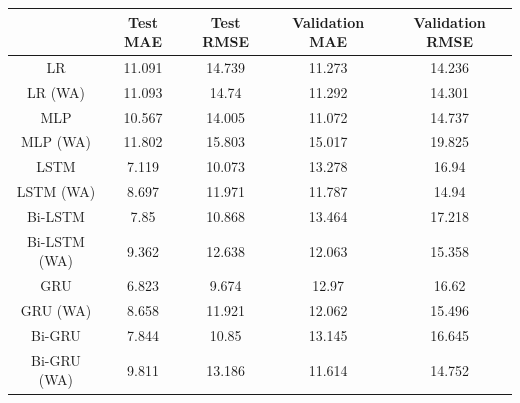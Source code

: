 \begin{table}[p]
\begin{minipage}{\textwidth}
        \vspace{0.2cm}
        \begin{tabular}{ |c|c|c|c|c| }
            \hline
            & Test MAE                  & Test RMSE                  & Validation MAE             & Validation RMSE            \\
            \hline
            LR           & \cellcolor{red!10}11.091  & \cellcolor{red!10}14.739   & \cellcolor{green!20}11.273 & \cellcolor{green!30}14.236 \\
            \hline
            LR (WA)      & \cellcolor{red!20}11.093  & \cellcolor{red!20}14.74    & \cellcolor{green!10}11.292 & \cellcolor{green!20}14.301 \\
            \hline
            MLP          & 10.567                    & 14.005                     & \cellcolor{green!30}11.072 & \cellcolor{green!10}14.737 \\
            \hline
            MLP (WA)     & \cellcolor{red!30}11.802  & \cellcolor{red!30}15.803   & \cellcolor{red!30}15.017   & \cellcolor{red!30}19.825   \\
            \hline
            LSTM         & \cellcolor{green!10}7.119 & \cellcolor{green!10}10.073 & \cellcolor{red!10}13.278   & \cellcolor{red!10}16.94    \\
            \hline
            LSTM (WA)    & 8.697                     & 11.971                     & 11.787                     & 14.94                      \\
            \hline
            Bi-LSTM      & 7.85                      & 10.868                     & \cellcolor{red!20}13.464   & \cellcolor{red!20}17.218   \\
            \hline
            Bi-LSTM (WA) & 9.362                     & 12.638                     & 12.063                     & 15.358                     \\
            \hline
            GRU          & \cellcolor{green!20}6.823 & \cellcolor{green!20}9.674  & 12.97                      & 16.62                      \\
            \hline
            GRU (WA)     & 8.658                     & 11.921                     & 12.062                     & 15.496                     \\
            \hline
            Bi-GRU       & 7.844                     & 10.85                      & 13.145                     & 16.645                     \\
            \hline
            Bi-GRU (WA)  & 9.811                     & 13.186                     & 11.614                     & 14.752                     \\

\end{tabular}
\end{minipage}
\end{table}
